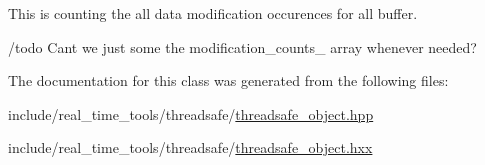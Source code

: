 This is counting the all data modification occurences for all buffer. 

/todo Can\textquotesingle{}t we just some the modification\+\_\+counts\+\_\+ array whenever needed? 

The documentation for this class was generated from the following files\+:\begin{DoxyCompactItemize}
\item 
include/real\+\_\+time\+\_\+tools/threadsafe/\hyperlink{threadsafe__object_8hpp}{threadsafe\+\_\+object.\+hpp}\item 
include/real\+\_\+time\+\_\+tools/threadsafe/\hyperlink{threadsafe__object_8hxx}{threadsafe\+\_\+object.\+hxx}\end{DoxyCompactItemize}

